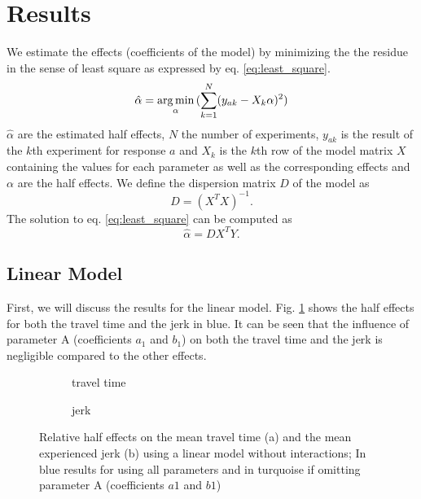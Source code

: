\section{Results}\label{sec:results}
We estimate the effects (coefficients of the model) by minimizing the the residue in the sense of least square as expressed by eq. \ref{eq:least_square}.
\begin{equation}\label{eq:least_square}
	\hat\alpha =  \operatorname*{arg\,min}_{\alpha}{(\sum_{k = 1}^{N} (y_{ak} -  X_{k}\alpha)^2)}
\end{equation}
$\hat\alpha$ are the estimated half effects, $N$ the number of experiments, $y_{ak}$ is the result of the $k$th experiment for response $a$ and $X_k$ is the $k$th row of the model matrix $X$ containing the values for each parameter as well as the corresponding effects and $\alpha$ are the half effects.
We define the dispersion matrix $D$ of the model as
\begin{equation}
	D = (X^T X)^{-1}.
\end{equation}
The solution to eq. \ref{eq:least_square} can be computed as
\begin{equation}
	\hat\alpha = D X^{T} Y.
\end{equation}


\subsection{Linear Model}
First, we will discuss the results for the linear model.
Fig. \ref{fig:effects_lin} shows the half effects for both the travel time and the jerk in blue. It can be seen that the influence of parameter A (coefficients $a_1$ and $b_1$) on both the travel time and the jerk is negligible compared to the other effects.
\begin{figure}[h]
    \centering
    \begin{subfigure}[b]{0.5\textwidth}
		\setlength{\abovecaptionskip}{1pt plus 3pt minus 0pt}	
	    
	    \caption{travel time}
	\end{subfigure}
    \begin{subfigure}[b]{0.5\textwidth}
	    \setlength{\abovecaptionskip}{1pt plus 3pt minus 0pt}
	    
   	    \caption{jerk}
	\end{subfigure}
	
    \caption{Relative half effects on the mean travel time (a) and the mean experienced jerk (b) using a linear model without interactions; In blue results for using all parameters and in turquoise if omitting parameter A (coefficients $a1$ and $b1$)}\label{fig:effects_lin}
\end{figure} 

